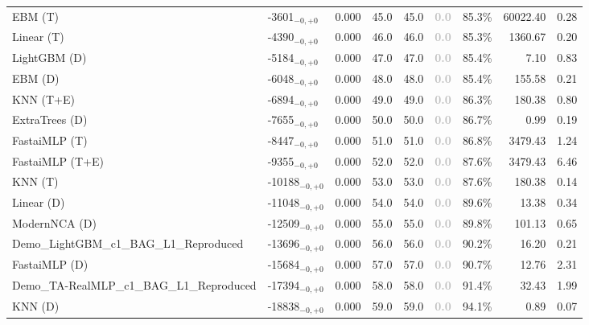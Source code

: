 \begin{tabular}{llcccccrr}
EBM (T) & -3601${}_{-0,+0}$ & 0.000 & 45.0 & 45.0 & \textcolor{silver}{\textbf{0.0}} & 85.3\% & 60022.40 & 0.28 \\
Linear (T) & -4390${}_{-0,+0}$ & 0.000 & 46.0 & 46.0 & \textcolor{silver}{\textbf{0.0}} & 85.3\% & 1360.67 & 0.20 \\
LightGBM (D) & -5184${}_{-0,+0}$ & 0.000 & 47.0 & 47.0 & \textcolor{silver}{\textbf{0.0}} & 85.4\% & 7.10 & 0.83 \\
EBM (D) & -6048${}_{-0,+0}$ & 0.000 & 48.0 & 48.0 & \textcolor{silver}{\textbf{0.0}} & 85.4\% & 155.58 & 0.21 \\
KNN (T+E) & -6894${}_{-0,+0}$ & 0.000 & 49.0 & 49.0 & \textcolor{silver}{\textbf{0.0}} & 86.3\% & 180.38 & 0.80 \\
ExtraTrees (D) & -7655${}_{-0,+0}$ & 0.000 & 50.0 & 50.0 & \textcolor{silver}{\textbf{0.0}} & 86.7\% & 0.99 & 0.19 \\
FastaiMLP (T) & -8447${}_{-0,+0}$ & 0.000 & 51.0 & 51.0 & \textcolor{silver}{\textbf{0.0}} & 86.8\% & 3479.43 & 1.24 \\
FastaiMLP (T+E) & -9355${}_{-0,+0}$ & 0.000 & 52.0 & 52.0 & \textcolor{silver}{\textbf{0.0}} & 87.6\% & 3479.43 & 6.46 \\
KNN (T) & -10188${}_{-0,+0}$ & 0.000 & 53.0 & 53.0 & \textcolor{silver}{\textbf{0.0}} & 87.6\% & 180.38 & 0.14 \\
Linear (D) & -11048${}_{-0,+0}$ & 0.000 & 54.0 & 54.0 & \textcolor{silver}{\textbf{0.0}} & 89.6\% & 13.38 & 0.34 \\
ModernNCA (D) & -12509${}_{-0,+0}$ & 0.000 & 55.0 & 55.0 & \textcolor{silver}{\textbf{0.0}} & 89.8\% & 101.13 & 0.65 \\
Demo_LightGBM_c1_BAG_L1_Reproduced & -13696${}_{-0,+0}$ & 0.000 & 56.0 & 56.0 & \textcolor{silver}{\textbf{0.0}} & 90.2\% & 16.20 & 0.21 \\
FastaiMLP (D) & -15684${}_{-0,+0}$ & 0.000 & 57.0 & 57.0 & \textcolor{silver}{\textbf{0.0}} & 90.7\% & 12.76 & 2.31 \\
Demo_TA-RealMLP_c1_BAG_L1_Reproduced & -17394${}_{-0,+0}$ & 0.000 & 58.0 & 58.0 & \textcolor{silver}{\textbf{0.0}} & 91.4\% & 32.43 & 1.99 \\
KNN (D) & -18838${}_{-0,+0}$ & 0.000 & 59.0 & 59.0 & \textcolor{silver}{\textbf{0.0}} & 94.1\% & 0.89 & 0.07 \\
\bottomrule
\end{tabular}